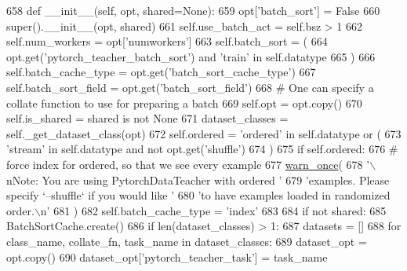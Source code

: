 \begin{DoxyCode}
658     \textcolor{keyword}{def }\_\_init\_\_(self, opt, shared=None):
659         opt[\textcolor{stringliteral}{'batch\_sort'}] = \textcolor{keyword}{False}
660         super().\_\_init\_\_(opt, shared)
661         self.use\_batch\_act = self.bsz > 1
662         self.num\_workers = opt[\textcolor{stringliteral}{'numworkers'}]
663         self.batch\_sort = (
664             opt.get(\textcolor{stringliteral}{'pytorch\_teacher\_batch\_sort'}) \textcolor{keywordflow}{and} \textcolor{stringliteral}{'train'} \textcolor{keywordflow}{in} self.datatype
665         )
666         self.batch\_cache\_type = opt.get(\textcolor{stringliteral}{'batch\_sort\_cache\_type'})
667         self.batch\_sort\_field = opt.get(\textcolor{stringliteral}{'batch\_sort\_field'})
668         \textcolor{comment}{# One can specify a collate function to use for preparing a batch}
669         self.opt = opt.copy()
670         self.is\_shared = shared \textcolor{keywordflow}{is} \textcolor{keywordflow}{not} \textcolor{keywordtype}{None}
671         dataset\_classes = self.\_get\_dataset\_class(opt)
672         self.ordered = \textcolor{stringliteral}{'ordered'} \textcolor{keywordflow}{in} self.datatype \textcolor{keywordflow}{or} (
673             \textcolor{stringliteral}{'stream'} \textcolor{keywordflow}{in} self.datatype \textcolor{keywordflow}{and} \textcolor{keywordflow}{not} opt.get(\textcolor{stringliteral}{'shuffle'})
674         )
675         \textcolor{keywordflow}{if} self.ordered:
676             \textcolor{comment}{# force index for ordered, so that we see every example}
677             \hyperlink{namespaceparlai_1_1utils_1_1misc_a884a3aefa90581f53bc592fa6a78dc43}{warn\_once}(
678                 \textcolor{stringliteral}{'\(\backslash\)nNote: You are using PytorchDataTeacher with ordered '}
679                 \textcolor{stringliteral}{'examples. Please specify `--shuffle` if you would like '}
680                 \textcolor{stringliteral}{'to have examples loaded in randomized order.\(\backslash\)n'}
681             )
682             self.batch\_cache\_type = \textcolor{stringliteral}{'index'}
683 
684         \textcolor{keywordflow}{if} \textcolor{keywordflow}{not} shared:
685             BatchSortCache.create()
686             \textcolor{keywordflow}{if} len(dataset\_classes) > 1:
687                 datasets = []
688                 \textcolor{keywordflow}{for} class\_name, collate\_fn, task\_name \textcolor{keywordflow}{in} dataset\_classes:
689                     dataset\_opt = opt.copy()
690                     dataset\_opt[\textcolor{stringliteral}{'pytorch\_teacher\_task'}] = task\_name

\end{DoxyCode}
